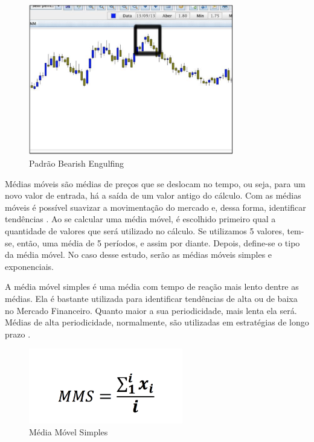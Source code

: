 \begin{figure}[h]
\centering
\label{f21}
\includegraphics[width=0.8\textwidth]{figuras/f21}
\caption{Padrão Bearish Engulfing}
\end{figure}


Médias móveis são médias de preços que se deslocam no tempo, ou seja, para um novo valor de entrada, há a saída de um valor antigo do cálculo. Com as médias móveis é possível suavizar a movimentação do mercado e, dessa forma, identificar tendências \cite[p.68]{matsura2006}. Ao se calcular uma média móvel, é escolhido primeiro qual a quantidade de valores que será utilizado no cálculo. Se utilizamos 5 valores, tem-se, então, uma média de 5 períodos, e assim por diante. Depois, define-se o tipo da média móvel. No caso desse estudo, serão as médias móveis simples e exponenciais.

A média móvel simples é uma média com tempo de reação mais lento dentre as médias. Ela é bastante utilizada para identificar tendências de alta ou de baixa no Mercado Financeiro. Quanto maior a sua periodicidade, mais lenta ela será. Médias de alta periodicidade, normalmente, são utilizadas em estratégias de longo prazo \cite[p. 69]{matsura2006}.

\begin{figure}[h]
\centering
\label{f22}
\includegraphics[width=0.6\textwidth]{figuras/f22}
\caption{Média Móvel Simples}
\end{figure}


